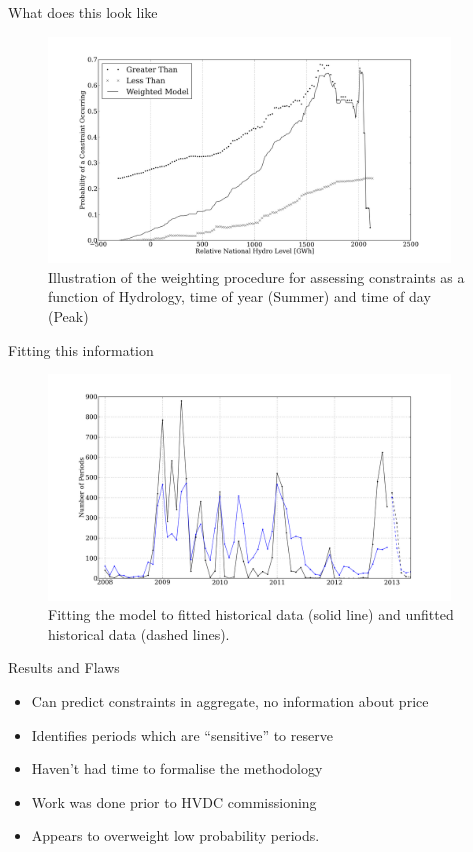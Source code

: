 \documentclass[xcolor=x11names,compress]{beamer}
\renewcommand{\(}{\begin{columns}}
\renewcommand{\)}{\end{columns}}
\newcommand{\<}[1]{\begin{column}{#1}}
\renewcommand{\>}{\end{column}}
\begin{document}
\begin{frame}{What does this look like}
\begin{figure}
\includegraphics[width=0.95\textwidth]{img/prob_models.png}
\caption{Illustration of the weighting procedure for assessing constraints as
a function of Hydrology, time of year (Summer) and time of day (Peak)}
\end{figure}
\end{frame}

\begin{frame}{Fitting this information}
\begin{figure}
\includegraphics[width=0.95\textwidth]{img/nimodelts.png}
\caption{Fitting the model to fitted historical data (solid line) and unfitted
historical data (dashed lines).}
\end{figure}
\end{frame}

\begin{frame}{Results and Flaws}
\begin{itemize}
\item Can predict constraints in aggregate, no information about price
\item Identifies periods which are ``sensitive'' to reserve
\item Haven't had time to formalise the methodology
\item Work was done prior to HVDC commissioning
\item Appears to overweight low probability periods.
\end{itemize}
\end{frame}
\end{document}
